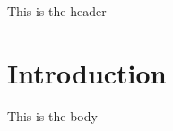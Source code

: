

This is the header


\newcommand{\BB}{{\mathbb B}}






\section{Introduction}

This is the body


